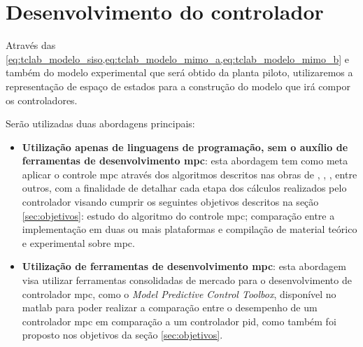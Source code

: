 \section{Desenvolvimento do controlador}
\label{sec:desenvolvimento_do_controlador}

Através das \cref{eq:tclab_modelo_siso,eq:tclab_modelo_mimo_a,eq:tclab_modelo_mimo_b}
e também do modelo experimental que será obtido da planta piloto, utilizaremos a representação de
espaço de estados para a construção do modelo que irá compor os controladores.

Serão utilizadas duas abordagens principais:

\begin{itemize}
    \item \textbf{Utilização apenas de linguagens de programação, sem o auxílio de ferramentas de desenvolvimento
        \acrshort{mpc}}: esta abordagem tem como meta aplicar o controle \acrshort{mpc} através dos algoritmos
        descritos nas obras de , , ,
        entre outros, com a finalidade de detalhar cada etapa dos cálculos realizados pelo controlador
        visando cumprir os seguintes objetivos descritos na seção \ref{sec:objetivos}: estudo do algoritmo do
        controle \acrshort{mpc}; comparação entre a implementação em duas ou mais plataformas e compilação
        de material teórico e experimental sobre \acrshort{mpc}.
    \item \textbf{Utilização de ferramentas de desenvolvimento \acrshort{mpc}}: esta abordagem visa utilizar
        ferramentas consolidadas de mercado para o desenvolvimento de controlador \acrshort{mpc}, como o
        \textit{Model Predictive Control Toolbox}, disponível no \acrshort{matlab} para poder realizar
        a comparação entre o desempenho de um controlador \acrshort{mpc} em comparação a um controlador
        \acrshort{pid}, como também foi proposto nos objetivos da seção \ref{sec:objetivos}.
\end{itemize}